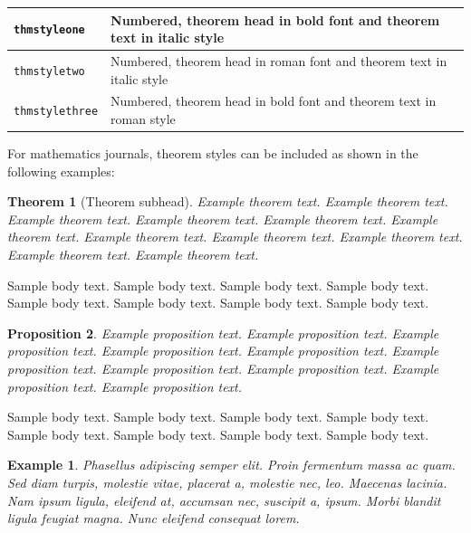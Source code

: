 \documentclass[pdflatex,sn-mathphys-num]{sn-jnl}%
\theoremstyle{thmstyleone}%
\newtheorem{theorem}{Theorem}%
\newtheorem{proposition}[theorem]{Proposition}%
\theoremstyle{thmstyletwo}%
\newtheorem{example}{Example}%
\theoremstyle{thmstylethree}%
\begin{document}
\bigskip
\begin{tabular}{|l|p{19pc}|}
\hline
\verb+thmstyleone+ & Numbered, theorem head in bold font and theorem text in italic style \\\hline
\verb+thmstyletwo+ & Numbered, theorem head in roman font and theorem text in italic style \\\hline
\verb+thmstylethree+ & Numbered, theorem head in bold font and theorem text in roman style \\\hline
\end{tabular}
\bigskip

For mathematics journals, theorem styles can be included as shown in the following examples:

\begin{theorem}[Theorem subhead]\label{thm1}
Example theorem text. Example theorem text. Example theorem text. Example theorem text. Example theorem text. 
Example theorem text. Example theorem text. Example theorem text. Example theorem text. Example theorem text. 
Example theorem text. 
\end{theorem}

Sample body text. Sample body text. Sample body text. Sample body text. Sample body text. Sample body text. Sample body text. Sample body text.

\begin{proposition}
Example proposition text. Example proposition text. Example proposition text. Example proposition text. Example proposition text. 
Example proposition text. Example proposition text. Example proposition text. Example proposition text. Example proposition text. 
\end{proposition}

Sample body text. Sample body text. Sample body text. Sample body text. Sample body text. Sample body text. Sample body text. Sample body text.

\begin{example}
Phasellus adipiscing semper elit. Proin fermentum massa
ac quam. Sed diam turpis, molestie vitae, placerat a, molestie nec, leo. Maecenas lacinia. Nam ipsum ligula, eleifend
at, accumsan nec, suscipit a, ipsum. Morbi blandit ligula feugiat magna. Nunc eleifend consequat lorem. 
\end{example}
\end{document}

